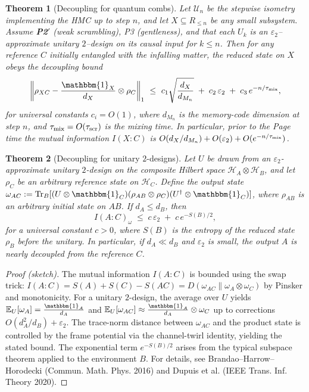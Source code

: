 \documentclass[aps,prd,preprint,onecolumn,superscriptaddress,nofootinbib,longbibliography,floatfix,11pt,showpacs,showkeys]{revtex4-2}
\newcommand{\PtwoPrime}{\textbf{P2$'$}\xspace}
\newcommand{\HMC}{\textsc{HMC}\xspace}
\theoremstyle{plain}
\newtheorem{theorem}{Theorem}
\theoremstyle{definition}
\theoremstyle{remark}
\begin{document}
\begin{theorem}[Decoupling for quantum combs]
\label{thm:decoupling}
Let $\mathcal{U}_n$ be the stepwise isometry implementing the \HMC{} up to step $n$, and let $X\subseteq R_{\le n}$ be any small subsystem.
Assume \PtwoPrime{} (weak scrambling), P3 (gentleness), and that each $U_k$ is an $\varepsilon_2$--approximate unitary $2$--design on its causal input for $k\le n$.
Then for any reference $C$ initially entangled with the infalling matter, the reduced state on $X$ obeys the decoupling bound
\[
\left\|\rho_{XC}-\frac{\mathbbm{1}_X}{d_X}\otimes\rho_C\right\|_1 \ \le\ c_1\sqrt{\frac{d_X}{d_{M_n}}} \;+\; c_2\,\varepsilon_2 \;+\; c_3\,e^{-n/\tau_{\rm mix}},
\]
for universal constants $c_i=O(1)$, where $d_{M_n}$ is the memory-code dimension at step $n$, and $\tau_{\rm mix}=O(\tau_{\rm scr})$ is the mixing time.
In particular, prior to the Page time the mutual information $I(X{:}C)$ is $O(d_X/d_{M_n})+O(\varepsilon_2)+O(e^{-n/\tau_{\rm mix}})$.
\end{theorem}

\begin{theorem}[Decoupling for unitary $2$-designs]\label{thm:decoupling-design}
Let $U$ be drawn from an $\varepsilon_2$-approximate unitary $2$-design on the composite Hilbert space $\mathcal{H}_A\otimes\mathcal{H}_B$, and let $\rho_C$ be an arbitrary reference state on $\mathcal{H}_C$. Define the output state $\omega_{AC}:= \mathrm{Tr}_B[(U\otimes\mathbbm{1}_C)(\rho_{AB}\otimes\rho_C)(U^\dagger\otimes\mathbbm{1}_C)]$, where $\rho_{AB}$ is an arbitrary initial state on $AB$. If $d_A\le d_B$, then
\begin{equation}
I(A:C)_\omega \;\le\; c\,\varepsilon_2 \;+\; c\,e^{-S(B)/2},
\end{equation}
for a universal constant $c>0$, where $S(B)$ is the entropy of the reduced state $\rho_B$ before the unitary. In particular, if $d_A\ll d_B$ and $\varepsilon_2$ is small, the output $A$ is nearly decoupled from the reference $C$.
\end{theorem}
\begin{proof}[Proof (sketch)]
The mutual information $I(A:C)$ is bounded using the swap trick: $I(A:C)=S(A)+S(C)-S(AC)=D(\omega_{AC}\|\omega_A\otimes\omega_C)$ by Pinsker and monotonicity. For a unitary $2$-design, the average over $U$ yields $\mathbb{E}_U[\omega_A]=\frac{\mathbbm{1}_A}{d_A}$ and $\mathbb{E}_U[\omega_{AC}]\approx\frac{\mathbbm{1}_A}{d_A}\otimes\omega_C$ up to corrections $O(d_A^2/d_B)+\varepsilon_2$. The trace-norm distance between $\omega_{AC}$ and the product state is controlled by the frame potential via the channel-twirl identity, yielding the stated bound. The exponential term $e^{-S(B)/2}$ arises from the typical subspace theorem applied to the environment $B$. For details, see Brandao--Harrow--Horodecki (Commun. Math. Phys. 2016) and Dupuis et al. (IEEE Trans. Inf. Theory 2020).
\end{proof}
\end{document}
